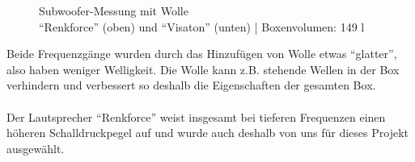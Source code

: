 \begin{figure} [H]
	\centering
	\quad
	\caption{Subwoofer-Messung mit Wolle\\ \enquote{Renkforce} (oben) und \enquote{Visaton} (unten) | Boxenvolumen: 149 l}
	\label{fig:5.3.3.3}
\end{figure}
Beide Frequenzgänge wurden durch das Hinzufügen von Wolle etwas \enquote{glatter}, also haben weniger Welligkeit.
Die Wolle kann z.B. stehende Wellen in der Box verhindern und verbessert so deshalb die Eigenschaften der gesamten Box.\\ \\	%
Der Lautsprecher \enquote{Renkforce} weist insgesamt bei tieferen Frequenzen einen höheren Schalldruckpegel auf und wurde auch deshalb von uns für dieses Projekt ausgewählt.


